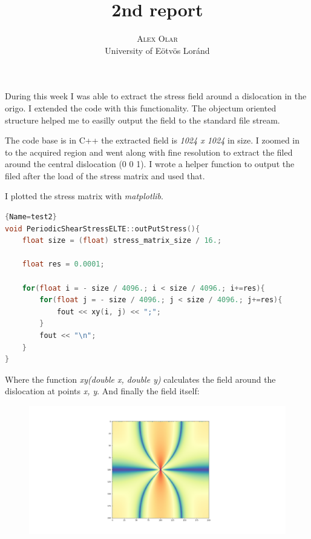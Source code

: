 \documentclass[12pt,a4paper]{article}
\title{\textbf{2nd report}}
\author{\Large{\textsc{Alex Olar}} \vspace{10pt}\\
	\textrm{University of Eötvös Loránd}
	}
\date{}
\theoremstyle{plain}
\begin{document}
\maketitle

\par During this week I was able to extract the stress field around a dislocation
in the origo. I extended the code with this functionality. The objectum oriented structure
helped me to easilly output the field to the standard file stream.

\par The code base is in C++ the extracted field is \textit{1024 x 1024} in size. I zoomed in to the acquired region
and went along with fine resolution to extract the filed around the central dislocation (0 0 1). I wrote a helper
function to output the filed after the load of the stress matrix and used that.

\par I plotted the stress matrix with \textit{matplotlib}.

\vfill

\begin{lstlisting}[language=C++]{Name=test2}
void PeriodicShearStressELTE::outPutStress(){
	float size = (float) stress_matrix_size / 16.;
	
	float res = 0.0001;
	
	for(float i = - size / 4096.; i < size / 4096.; i+=res){
		for(float j = - size / 4096.; j < size / 4096.; j+=res){
			fout << xy(i, j) << ";";
		}
		fout << "\n";
	}	
}	
\end{lstlisting}

\par Where the function \textit{xy(double x, double y)} calculates the field around the dislocation
at points \textit{x, y}. And finally the field itself:

\begin{figure}[H]
	\centering
	\includegraphics[width=1.\textwidth]{../week02/stess_field_orig.png}
\end{figure}
\end{document}
